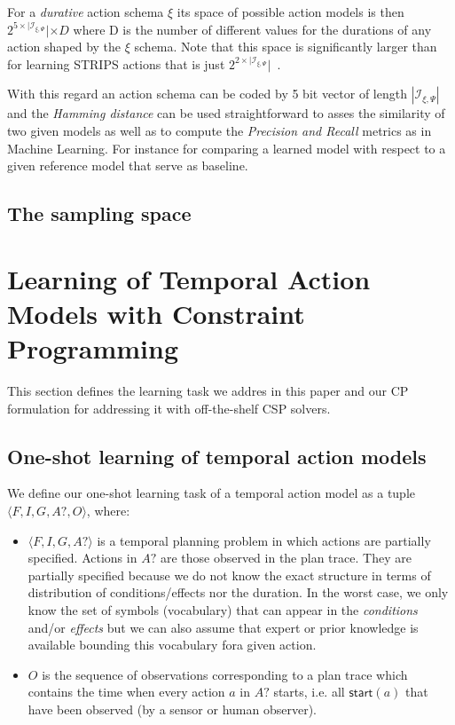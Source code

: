 \documentclass{ecai}
\newcommand{\tup}[1]{{\langle #1 \rangle}}
\newcommand{\start}{\mathsf{start}}%
\begin{document}
For a {\em durative} action schema $\xi$ its space of possible action models is then $2^{5\times|{\mathcal I}_{\xi,\Psi}}|\times D$ where D is the number of different values for the durations of any action shaped by the $\xi$ schema. Note that this space is significantly larger than for learning STRIPS actions that is just $2^{2\times|{\mathcal I}_{\xi,\Psi}}|$~\cite{yang2007learning}.

With this regard an action schema can be coded by 5 bit vector of length $|{\mathcal I}_{\xi,\Psi}|$ and the {\em Hamming distance} can be used straightforward to asses the similarity of two given models as well as to compute the {\em Precision and Recall} metrics as in Machine Learning. For instance for comparing a learned model with respect to a given reference model that serve as baseline.

\subsection{The sampling space}
\label{sec:sampling-space}




\section{Learning of Temporal Action Models with Constraint Programming}
This section defines the learning task we addres in this paper and our CP formulation for addressing it with off-the-shelf CSP solvers.

\subsection{One-shot learning of temporal action models}
We define our one-shot learning task of a temporal action model as a tuple $\tup{F,I,G,A?,O}$, where:

\begin{itemize}
\item $\tup{F,I,G,A?}$ is a temporal planning problem in which actions are partially specified. Actions in $A?$ are those observed in the plan trace. They are partially specified because we do not know the exact structure in terms of distribution of conditions/effects nor the duration. In the worst case, we only know the set of symbols (vocabulary) that can appear in the {\em conditions} and/or {\em effects} but we can also assume that expert or prior knowledge is available bounding this vocabulary fora given action.
\item $O$ is the sequence of observations corresponding to a plan trace which contains the time when every action $a$ in $A?$ starts, i.e. all $\start(a)$ that have been observed (by a sensor or human observer).
\end{itemize}
\end{document}
